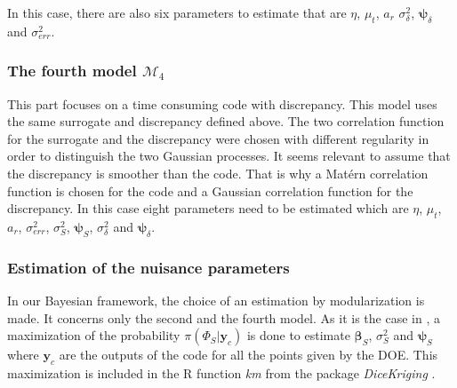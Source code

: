 \documentclass[soumission]{jsfds}
\begin{document}
In this case, there are also six parameters to estimate that are $\eta$, $\mu_t$, $a_r$ $\sigma_{\delta}^2$, $\boldsymbol{\psi}_{\delta}$ and $\sigma_{err}^2$.

\subsubsection{The fourth model $\mathcal{M}_4$}

This part focuses on a time consuming code with discrepancy. This model uses the same surrogate and discrepancy defined above. The two correlation function for the surrogate and the discrepancy were chosen with different regularity in order to distinguish the two Gaussian processes. It seems relevant to assume that the discrepancy is smoother than the code. That is why a Matérn correlation function is chosen for the code and a Gaussian correlation function for the discrepancy. In this case eight parameters need to be estimated which are $\eta$, $\mu_t$, $a_r$, $\sigma_{err}^2$, $\sigma_S^2$, $\boldsymbol{\psi}_S$, $\sigma_{\delta}^2$ and $\boldsymbol{\psi}_{\delta}$.



\subsubsection{Estimation of the nuisance parameters}

In our Bayesian framework, the choice of an estimation by modularization is made. It concerns only the second and the fourth model. As it is the case in \citet{kennedy2001}, a maximization of the probability $\pi(\Phi_S|\boldsymbol{y}_c)$ is done to estimate $\boldsymbol{\beta}_S$, $\sigma_S^2$ and $\boldsymbol{\psi}_S$ where $\boldsymbol{y}_c$ are the outputs of the code for all the points given by the DOE. This maximization is included in the R function \textit{km} from the package \textit{DiceKriging} \citep{roustant2012}.
\end{document}
